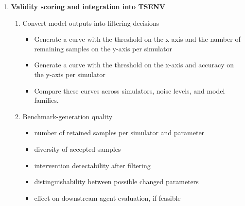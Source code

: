 \documentclass[11pt]{article}
\begin{document}
\begin{enumerate}[label=\arabic*.]
    \item \textbf{Validity scoring and integration into TSENV}
    \begin{enumerate}[label=\arabic{enumi}.\arabic*.]
        \item Convert model outputs into filtering decisions
        \begin{itemize}
            \item Generate a curve with the threshold on the x-axis and the number of remaining samples on the y-axis per simulator
            \item Generate a curve with the threshold on the x-axis and accuracy on the y-axis per simulator
            \item Compare these curves across simulators, noise levels, and model families.
        \end{itemize}
        \item Benchmark-generation quality
        \begin{itemize}
            \item number of retained samples per simulator and parameter
            \item diversity of accepted samples
            \item intervention detectability after filtering
            \item distinguishability between possible changed parameters
            \item effect on downstream agent evaluation, if feasible
        \end{itemize}
    \end{enumerate}


\end{enumerate}
\end{document}
